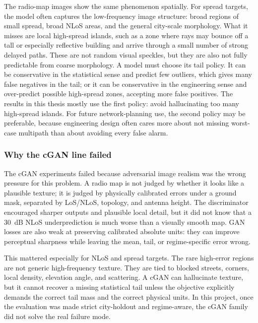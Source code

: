 The radio-map images show the same phenomenon spatially. For spread targets,
the model often captures the low-frequency image structure: broad regions of
small spread, broad NLoS areas, and the general city-scale morphology. What it
misses are local high-spread islands, such as a zone where rays may bounce off
a tall or especially reflective building and arrive through a small number of
strong delayed paths. These are not random visual speckles, but they are also
not fully predictable from coarse morphology. A model must choose its tail
policy. It can be conservative in the statistical sense and predict few
outliers, which gives many false negatives in the tail; or it can be
conservative in the engineering sense and over-predict possible high-spread
zones, accepting more false positives. The results in this thesis mostly use
the first policy: avoid hallucinating too many high-spread islands. For future
network-planning use, the second policy may be preferable, because engineering
design often cares more about not missing worst-case multipath than about
avoiding every false alarm.

\subsubsection{Why the cGAN line failed}

The cGAN experiments failed because adversarial image realism was the wrong
pressure for this problem. A radio map is not judged by whether it looks like
a plausible texture; it is judged by physically calibrated errors under a
ground mask, separated by LoS/NLoS, topology, and antenna height. The
discriminator encouraged sharper outputs and plausible local detail, but it
did not know that a \SI{30}{dB} NLoS underprediction is much worse than a
visually smooth map. GAN losses are also weak at preserving calibrated
absolute units: they can improve perceptual sharpness while leaving the mean,
tail, or regime-specific error wrong.

This mattered especially for NLoS and spread targets. The rare high-error
regions are not generic high-frequency texture. They are tied to blocked
streets, corners, local density, elevation angle, and scattering. A cGAN can
hallucinate texture, but it cannot recover a missing statistical tail unless
the objective explicitly demands the correct tail mass and the correct
physical units. In this project, once the evaluation was made strict
city-holdout and regime-aware, the cGAN family did not solve the real
failure mode.

